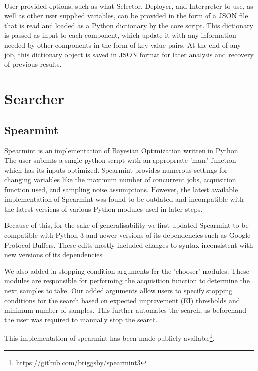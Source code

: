 \documentclass{report}
\begin{document}
\paragraph{}
User-provided options, such as what Selector, Deployer, and Interpreter to use, as well as other user supplied variables, can be provided in the form of a JSON file that is read and loaded as a Python dictionary by the core script. This dictionary is passed as input to each component, which update it with any information needed by other components in the form of key-value pairs. At the end of any job, this dictionary object is saved in JSON format for later analysis and recovery of previous results.

\section{Searcher}
\subsection{Spearmint}
Spearmint is an implementation of Bayesian Optimization written in Python\cite{Snoek2012}. The user submits a single python script with an appropriate 'main' function which has its inputs optimized. Spearmint provides numerous settings for changing variables like the maximum number of concurrent jobs, acquisition function used, and sampling noise assumptions. However, the latest available implementation of Spearmint was found to be outdated and incompatible with the latest versions of various Python modules used in later steps. 

Because of this, for the sake of generalisability we first updated Spearmint to be compatible with Python 3 and newer versions of its dependencies such as Google Protocol Buffers. These edits mostly included changes to syntax inconsistent with new versions of its dependencies.

We also added in stopping condition arguments for the 'chooser' modules. These modules are responsible for performing the acquisition function to determine the next samples to take. Our added arguments allow users to specify stopping conditions for the search based on expected improvement (EI) thresholds and minimum number of samples. This further automates the search, as beforehand the user was required to manually stop the search.

This implementation of spearmint has been made publicly available\footnote{https://github.com/briggsby/spearmint3}. 
\end{document}
